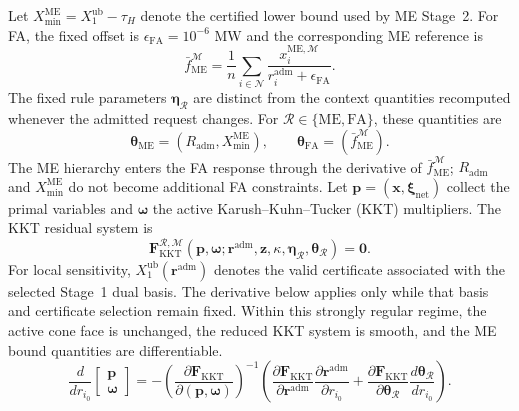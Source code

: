 \documentclass[11pt]{article}
\begin{document}
Let $X_{\min}^{\mathrm{ME}}=X_1^{\mathrm{ub}}-\tau_H$ denote the certified lower bound used by
ME Stage~2. For FA, the fixed
offset is $\epsilon_{\mathrm{FA}}=10^{-6}$ MW and the corresponding ME reference is
\begin{equation}
\bar f_{\mathrm{ME}}^{\mathcal M}
=\frac{1}{n}\sum_{i\in\mathcal N}
\frac{x_i^{\mathrm{ME},\mathcal M}}{r_i^{\mathrm{adm}}+\epsilon_{\mathrm{FA}}}.
\label{eq:supp_fairness_reference}
\end{equation}
The fixed rule parameters $\boldsymbol\eta_{\mathcal R}$ are distinct from the
context quantities recomputed whenever the admitted request changes. For
$\mathcal R\in\{\mathrm{ME},\mathrm{FA}\}$, these quantities are
\begin{equation}
\boldsymbol\theta_{\mathrm{ME}}=(R_{\mathrm{adm}},X_{\min}^{\mathrm{ME}}),
\qquad
\boldsymbol\theta_{\mathrm{FA}}=(\bar f_{\mathrm{ME}}^{\mathcal M}).
\label{eq:supp_endogenous_context}
\end{equation}
The ME hierarchy enters the FA response through the derivative of
$\bar f_{\mathrm{ME}}^{\mathcal M}$; $R_{\mathrm{adm}}$ and
$X_{\min}^{\mathrm{ME}}$ do not
become additional FA constraints.
Let $\mathbf p=(\mathbf x,\boldsymbol\xi_{\mathrm{net}})$ collect the primal
variables and $\boldsymbol\omega$ the active Karush--Kuhn--Tucker (KKT)
multipliers. The KKT residual system is
\begin{equation}
\mathbf F_{\mathrm{KKT}}^{\mathcal R,\mathcal M}
(\mathbf p,\boldsymbol\omega;\mathbf r^{\mathrm{adm}},
\mathbf z,\kappa,\boldsymbol\eta_{\mathcal R},
\boldsymbol\theta_{\mathcal R})=\mathbf{0}.
\label{eq:supp_kkt_map}
\end{equation}
For local sensitivity, $X_1^{\mathrm{ub}}(\mathbf r^{\mathrm{adm}})$ denotes the
valid certificate associated with the selected Stage~1 dual basis. The derivative
below applies only while that basis and certificate selection remain fixed.
Within this strongly regular regime, the active cone face is unchanged, the
reduced KKT system is smooth, and the ME bound quantities are differentiable.
\begin{equation}
\frac{d}{dr_{i_0}}
\begin{bmatrix}\mathbf p\\\boldsymbol\omega\end{bmatrix}
=-
\left(
\frac{\partial\mathbf F_{\mathrm{KKT}}}
{\partial(\mathbf p,\boldsymbol\omega)}
\right)^{-1}
\left(
\frac{\partial\mathbf F_{\mathrm{KKT}}}{\partial\mathbf r^{\mathrm{adm}}}
\frac{\partial\mathbf r^{\mathrm{adm}}}{\partial r_{i_0}}
+\frac{\partial\mathbf F_{\mathrm{KKT}}}
{\partial\boldsymbol\theta_{\mathcal R}}
\frac{d\boldsymbol\theta_{\mathcal R}}{dr_{i_0}}
\right).
\label{eq:supp_kkt_total_chain_rule}
\end{equation}
\end{document}

